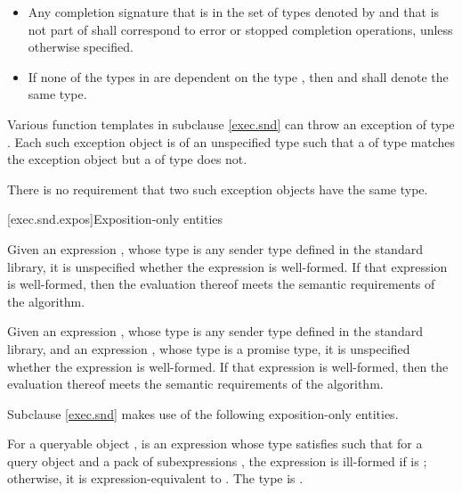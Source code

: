 \begin{itemize}
\item
Any completion signature
that is in the set of types
denoted by  and
that is not part of  shall correspond to
error or stopped completion operations,
unless otherwise specified.

\item
If none of the types in  are dependent on the type , then
 and
shall denote the same type.
\end{itemize}

\pnum
{}%
Various function templates in subclause \ref{exec.snd}
can throw an exception of type .
Each such exception object is of an unspecified type
such that a  of type 
matches the exception object
but a  of type  does not.
\begin{note}
There is no requirement that two such exception objects have the same type.
\end{note}

[exec.snd.expos]{Exposition-only entities}

\pnum
Given an expression ,
whose type is any sender type defined in the standard library,
it is unspecified
whether the expression  is well-formed.
If that expression is well-formed,
then the evaluation thereof meets the semantic requirements of
the  algorithm.

\pnum
Given an expression ,
whose type is any sender type defined in the standard library,
and an expression ,
whose type is a promise type,
it is unspecified
whether the expression  is well-formed.
If that expression is well-formed,
then the evaluation thereof meets the semantic requirements of
the  algorithm.

\pnum
Subclause \ref{exec.snd} makes use of the following exposition-only entities.

\pnum
{}%
For a queryable object ,
 is an expression
whose type satisfies 
such that for a query object  and
a pack of subexpressions ,
the expression  is ill-formed
if  is ;
otherwise, it is expression-equivalent to .
%
The type  is
.

